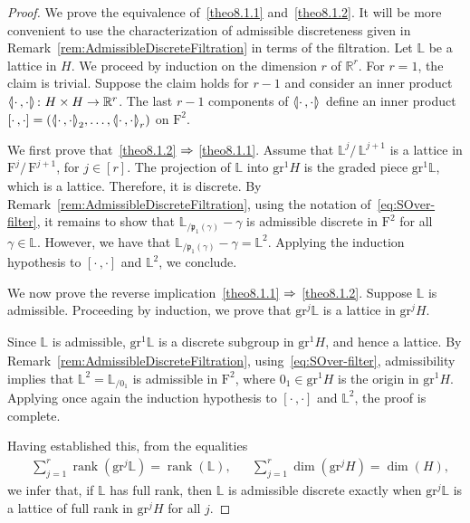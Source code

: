 \documentclass[AHL,Unicode,longabstracts]{cedram}
\newcommand{\llangle}{\mathopen{\langle\mkern -3.1mu\lvert}}
\newcommand{\rrangle}{\mathclose{\rvert\mkern -3.1mu\rangle}}
\newcommand{\highinn}[2]{{\llangle#2\rrangle_{#1}}}
\newcommand{\rquot}[2]{#1/\,#2}
\DeclareMathOperator{\rk}{rank}
\newcommand{\filter}{\mathrm{F}}
\newcommand{\R}{\mathbb{R}}
\renewcommand{\L}{\mathbb{L}}
\newcommand{\grm}[2]{\mathrm{gr}_{#1}^{#2}}
\newcommand{\proj}{\mathfrak{p}}
\renewcommand*{\to}{\mathchoice{\longrightarrow}{\rightarrow}{\rightarrow}{\rightarrow}}
\renewcommand*{\implies}{\mathchoice{\Longrightarrow}{\Rightarrow}{\Rightarrow}{\Rightarrow}}
\begin{document}
\begin{proof}
We prove the equivalence of~\eqref{theo8.1.1} and~\eqref{theo8.1.2}. It will be more convenient to use the characterization of admissible discreteness given in Remark~\ref{rem:AdmissibleDiscreteFiltration} in terms of the filtration. Let $\L$ be a lattice in $H$. We proceed by induction on the dimension $r$ of $\R^r$. For $r=1$, the claim is trivial. Suppose the claim holds for $r-1$ and consider an inner product $\highinn{}{\cdot\,,\cdot}\colon H\times H \to \R^r$. The last $r-1$ components of $\highinn{}{\cdot\,,\cdot}$ define an inner product $[\cdot \,, \cdot] =(\highinn{2}{\cdot\,,\cdot}, \dots, \highinn{r}{\cdot\,,\cdot})$ on $\filter^{2}$.


We first prove that~\eqref{theo8.1.2} $\implies$ \eqref{theo8.1.1}. Assume that $\rquot{\L^j}{\L^{j+1}}$ is a lattice in $\rquot{\filter^j}{\filter^{j+1}}$, for $j\in[r]$. The projection of $\L$ into $\grm{}{1}H$ is the graded piece $\grm{}{1}\L$, which is a lattice. Therefore, it is discrete. By Remark~\ref{rem:AdmissibleDiscreteFiltration}, using the notation of~\eqref{eq:SOver-filter}, it remains to show that $\L_{/\proj_1(\gamma)}-\gamma$ is admissible discrete in $\filter^2$ for all $\gamma\in \L$. However, we have that $\L_{/\proj_1(\gamma)}-\gamma = \L^2$. Applying the induction hypothesis to $[\cdot \,, \cdot] $ and $\L^2$, we conclude.


We now prove the reverse implication~\eqref{theo8.1.1} $\implies$ \eqref{theo8.1.2}. Suppose $\L$ is admissible. Proceeding by induction, we prove that $\grm{}{j}\L$ is a lattice in $\grm{}{j}H$.

Since $\L$ is admissible, $\grm{}{1}\L$ is a discrete subgroup in $\grm{}{1}H$, and hence a lattice. By Remark~\ref{rem:AdmissibleDiscreteFiltration}, using~\eqref{eq:SOver-filter}, admissibility implies that $\L^2 =\L_{/0_1}$ is admissible in $\filter^2$, where $0_1 \in \grm{}{1}H$ is the origin in $\grm{}{1}H$. Applying once again the induction hypothesis to $[\cdot \,, \cdot] $ and $\L^2$, the proof is complete.


Having established this, from the equalities
\begin{align*}
&\sum_{j=1}^r \rk \left(\grm{}{j}\L\right)= \rk(\L), &&\sum_{j=1}^r \dim\left(\grm{}{j}H\right) = \dim(H),
\end{align*}
we infer that, if $\L$ has full rank, then $\L$ is admissible discrete exactly when $\grm{}{j}\L$ is a lattice of full rank in $\grm{}{j}H$ for all $j$.
\end{proof}
\end{document}
